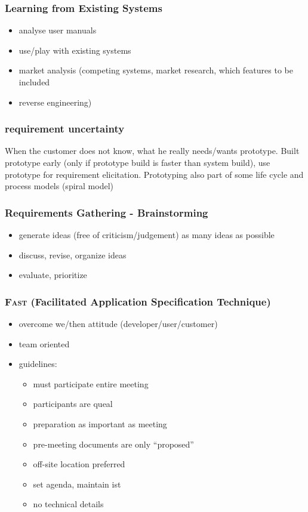 \documentclass[a4paper, 10pt]{article}
\begin{document}
\subsubsection*{Learning from Existing Systems}
\begin{itemize}
	\item analyse user manuals
	\item use/play with existing systems
	\item market analysis (competing systems, market research, which features to be included
	\item reverse engineering)
\end{itemize}

\subsubsection*{requirement uncertainty}
When the customer does not know, what he really needs/wants \follows prototype.
Built prototype early (only if prototype build is faster than system build),
use prototype for requirement elicitation.
Prototyping also part of some life cycle and process models (spiral model)

\subsubsection{Requirements Gathering - Brainstorming}
\begin{itemize}
	\item generate ideas (free of criticism/judgement) \follows as many ideas as possible
	\item discuss, revise, organize ideas
	\item evaluate, prioritize
\end{itemize}

\subsubsection{\textsc{Fast} (Facilitated Application Specification Technique)}
\begin{itemize}
	\item overcome we/then attitude (developer/user/customer)
	\item team oriented
	\item guidelines:
		\begin{itemize}
			\item must participate entire meeting
			\item participants are queal
			\item preparation as important as meeting
			\item pre-meeting documents are only ``proposed''
			\item off-site location preferred
			\item set agenda, maintain ist
			\item no technical details
		\end{itemize}
\end{itemize}
\end{document}
